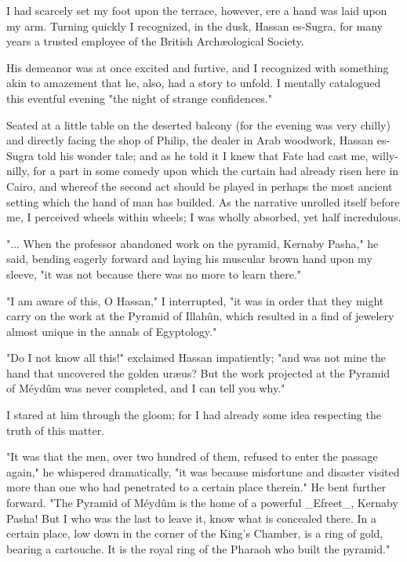 I had scarcely set my foot upon the terrace, however, ere a hand was
laid upon my arm. Turning quickly I recognized, in the dusk, Hassan
es-Sugra, for many years a trusted employee of the British
Archæological Society.

His demeanor was at once excited and furtive, and I recognized with
something akin to amazement that he, also, had a story to unfold. I
mentally catalogued this eventful evening "the night of strange
confidences."

Seated at a little table on the deserted balcony (for the evening was
very chilly) and directly facing the shop of Philip, the dealer in
Arab woodwork, Hassan es-Sugra told his wonder tale; and as he told it
I knew that Fate had cast me, willy-nilly, for a part in some comedy
upon which the curtain had already risen here in Cairo, and whereof
the second act should be played in perhaps the most ancient setting
which the hand of man has builded. As the narrative unrolled itself
before me, I perceived wheels within wheels; I was wholly absorbed,
yet half incredulous.

"... When the professor abandoned work on the pyramid, Kernaby Pasha,"
he said, bending eagerly forward and laying his muscular brown hand
upon my sleeve, "it was not because there was no more to learn
there."

"I am aware of this, O Hassan," I interrupted, "it was in order that
they might carry on the work at the Pyramid of Illahûn, which resulted
in a find of jewelery almost unique in the annals of Egyptology."

"Do I not know all this!" exclaimed Hassan impatiently; "and was not
mine the hand that uncovered the golden uræus? But the work projected
at the Pyramid of Méydûm was never completed, and I can tell you why."

I stared at him through the gloom; for I had already some idea
respecting the truth of this matter.

"It was that the men, over two hundred of them, refused to enter the
passage again," he whispered dramatically, "it was because misfortune
and disaster visited more than one who had penetrated to a certain
place therein." He bent further forward. "The Pyramid of Méydûm is the
home of a powerful _Efreet_, Kernaby Pasha! But I who was the last to
leave it, know what is concealed there. In a certain place, low down
in the corner of the King's Chamber, is a ring of gold, bearing a
cartouche. It is the royal ring of the Pharaoh who built the pyramid."


